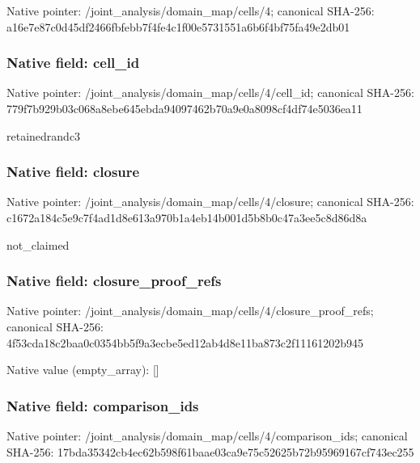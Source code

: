 \documentclass[10pt,a4paper]{article}
\begin{document}
Native pointer: /joint\_analysis/domain\_map/cells/4; canonical SHA-256: a16e7e87c0d45df2466fbfeb\allowbreak{}b7f4fe4c1f00e5731551a6b6\allowbreak{}f4bf75fa49e2db01



\subsubsection{Native field: cell\_id}


Native pointer: /joint\_analysis/domain\_m\allowbreak{}ap/cells/4/cell\_id; canonical SHA-256: 779f7b929b03c068a8ebe645\allowbreak{}ebda94097462b70a9e0a8098\allowbreak{}cf4df74e5036ea11


retainedrandc3


\subsubsection{Native field: closure}


Native pointer: /joint\_analysis/domain\_m\allowbreak{}ap/cells/4/closure; canonical SHA-256: c1672a184c5e9c7f4ad1d8e6\allowbreak{}13a970b1a4eb14b001d5b8b0\allowbreak{}c47a3ee5c8d86d8a


not\_claimed


\subsubsection{Native field: closure\_proof\_refs}


Native pointer: /joint\_analysis/domain\_m\allowbreak{}ap/cells/4/closure\_proof\allowbreak{}\_refs; canonical SHA-256: 4f53cda18c2baa0c0354bb5f\allowbreak{}9a3ecbe5ed12ab4d8e11ba87\allowbreak{}3c2f11161202b945



Native value (empty\_array): []



\subsubsection{Native field: comparison\_ids}


Native pointer: /joint\_analysis/domain\_m\allowbreak{}ap/cells/4/comparison\_id\allowbreak{}s; canonical SHA-256: 17bda35342cb4ec62b598f61\allowbreak{}baae03ca9e75c52625b72b95\allowbreak{}969167cf743ec255
\end{document}
